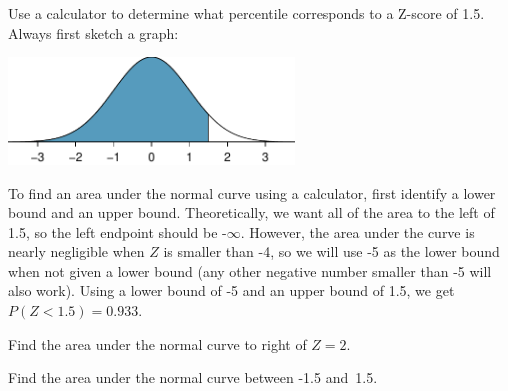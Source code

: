 \begin{examplewrap}
\begin{nexample}{Use a calculator to determine what percentile corresponds to a Z-score of 1.5.}
Always first sketch a graph:\footnotemark
\begin{center}
\includegraphics[width=0.57\textwidth]{ch_distributions/figures/zscoreleftof1point5/zscoreleftof1point5}\vspace{-2mm}
\end{center}
To find an area under the normal curve using a calculator, first identify a lower bound and an upper bound. Theoretically, we want all of the area to the left of 1.5, so the left endpoint should be -$\infty$. However, the area under the curve is nearly negligible when $Z$ is smaller than -4, so we will use -5 as the lower bound when not given a lower bound (any other negative number smaller than -5 will also work). Using a lower bound of -5 and an upper bound of 1.5, we get $P(Z < 1.5) = 0.933$.
\end{nexample}
\end{examplewrap}

\begin{exercisewrap}
\begin{nexercise}
Find the area under the normal curve to right of $Z=2$.~\footnotemark
\end{nexercise}
\end{exercisewrap}

\begin{exercisewrap}
\begin{nexercise}Find the area under the normal curve between -1.5 and~1.5.~\footnotemark\end{nexercise}
\end{exercisewrap}


